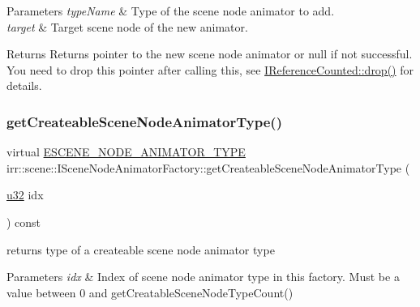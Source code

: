 \begin{DoxyParams}{Parameters}
{\em type\+Name} & Type of the scene node animator to add. \\
\hline
{\em target} & Target scene node of the new animator. \\
\hline
\end{DoxyParams}
\begin{DoxyReturn}{Returns}
Returns pointer to the new scene node animator or null if not successful. You need to drop this pointer after calling this, see \hyperlink{classirr_1_1IReferenceCounted_a03856a09355b89d178090c4a5f738543}{I\+Reference\+Counted\+::drop()} for details. 
\end{DoxyReturn}
\mbox{\label{classirr_1_1scene_1_1ISceneNodeAnimatorFactory_a6b423730b46154f5e0c3bcfd21e41755}} 
\subsubsection{\texorpdfstring{get\+Createable\+Scene\+Node\+Animator\+Type()}{getCreateableSceneNodeAnimatorType()}\hspace{0.1cm}{\footnotesize\ttfamily [1/2]}}
{\footnotesize\ttfamily virtual \hyperlink{namespaceirr_1_1scene_a327a1e43872705cf8f3f3342fb307d19}{E\+S\+C\+E\+N\+E\+\_\+\+N\+O\+D\+E\+\_\+\+A\+N\+I\+M\+A\+T\+O\+R\+\_\+\+T\+Y\+PE} irr\+::scene\+::\+I\+Scene\+Node\+Animator\+Factory\+::get\+Createable\+Scene\+Node\+Animator\+Type (\begin{DoxyParamCaption}\item[{\hyperlink{namespaceirr_a0416a53257075833e7002efd0a18e804}{u32}}]{idx }\end{DoxyParamCaption}) const\hspace{0.3cm}{\ttfamily [pure virtual]}}



returns type of a createable scene node animator type 


\begin{DoxyParams}{Parameters}
{\em idx} & Index of scene node animator type in this factory. Must be a value between 0 and get\+Creatable\+Scene\+Node\+Type\+Count() \\
\hline
\end{DoxyParams}
\mbox{\label{classirr_1_1scene_1_1ISceneNodeAnimatorFactory_a6b423730b46154f5e0c3bcfd21e41755}} 
